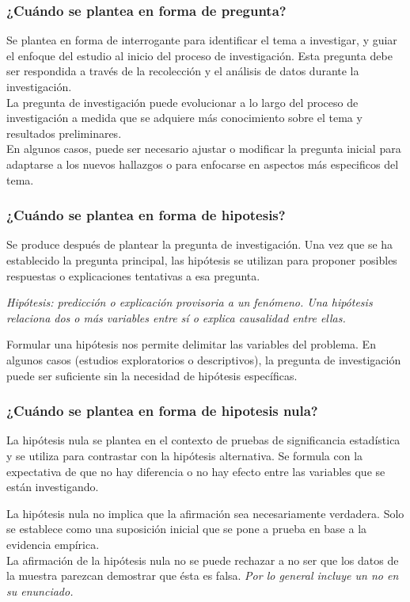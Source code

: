 \documentclass[
	11pt, %
]{beamer}
\begin{document}
\begin{frame}
  \frametitle{¿Cuándo se plantea en forma de pregunta?}
  \bigskip %
  Se plantea en forma de interrogante para identificar el tema a investigar, y guiar el enfoque del estudio al inicio del proceso de investigación. Esta pregunta debe ser respondida a través de la recolección y el análisis de datos durante la investigación.\\
  \bigskip %
  La pregunta de investigación puede evolucionar a lo largo del proceso de investigación a medida que se adquiere más conocimiento sobre el tema y resultados preliminares.\\
  \bigskip %
  En algunos casos, puede ser necesario ajustar o modificar la pregunta inicial para adaptarse a los nuevos hallazgos o para enfocarse en aspectos más especificos del tema.
  
\end{frame}


\begin{frame}
  \frametitle{¿Cuándo se plantea en forma de hipotesis?}
  \bigskip %

  Se produce después de plantear la pregunta de investigación. Una vez que se ha establecido la pregunta principal, las hipótesis se utilizan para proponer posibles respuestas o explicaciones tentativas a esa pregunta.

  \bigskip %

  \textit{Hipótesis: predicción o explicación provisoria a un fenómeno. Una hipótesis relaciona dos o más variables entre sí o explica causalidad entre ellas.}

  \bigskip %

  Formular una hipótesis nos permite delimitar las variables del problema. En algunos casos (estudios exploratorios o descriptivos), la pregunta de investigación puede ser suficiente sin la necesidad de hipótesis específicas.
  
\end{frame}

\begin{frame}
  \frametitle{¿Cuándo se plantea en forma de hipotesis nula?}
  \bigskip %
  La hipótesis nula se plantea en el contexto de pruebas de significancia estadística y se utiliza para contrastar con la hipótesis alternativa. Se formula con la expectativa de que no hay diferencia o no hay efecto entre las variables que se están investigando.
  \bigskip %

  La hipótesis nula no implica que la afirmación sea necesariamente verdadera. Solo se establece como una suposición inicial que se pone a prueba en base a la evidencia empírica.\\
  \bigskip %
  La afirmación de la hipótesis nula no se puede rechazar a no ser que los datos de la muestra parezcan demostrar que ésta es falsa. \textit{Por lo general incluye un no en su enunciado.}
  
  
\end{frame}
\end{document}
